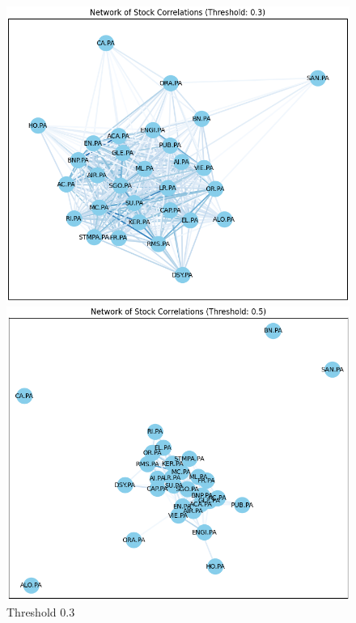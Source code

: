 \documentclass[12pt]{article}
\begin{document}
\begin{figure}[h!]
  \centering
  \begin{minipage}[b]{0.32\textwidth}
      \includegraphics[width=\textwidth]{2D_network_stock_corr3.png}
      \caption{Threshold 0.3}
      \label{fig:threshold03}
  \end{minipage}
  \hfill
  \begin{minipage}[b]{0.32\textwidth}
      \includegraphics[width=\textwidth]{2D_network_stock_corr5.png}

\end{minipage}
\end{figure}
\end{document}
